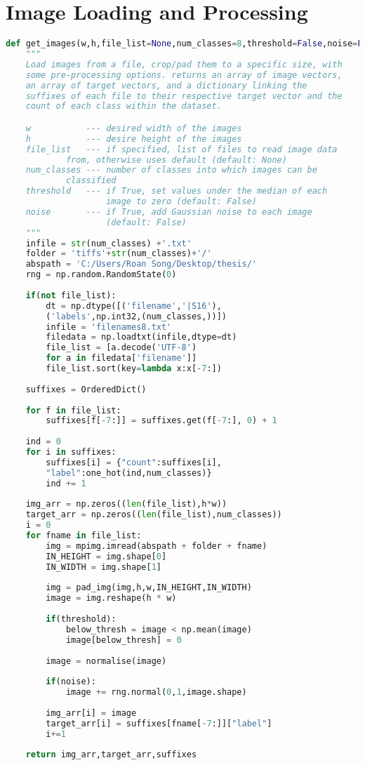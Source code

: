 \chapter{Image Loading and Processing}
\begin{lstlisting}[language=Python, caption=Loading and Processing Images, captionpos=b, label={list:get_images}]
def get_images(w,h,file_list=None,num_classes=8,threshold=False,noise=False):
	"""
	Load images from a file, crop/pad them to a specific size, with 
	some pre-processing options. returns an array of image vectors, 
	an array of target vectors, and a dictionary linking the 
	suffixes of each file to their respective target vector and the 
	count of each class within the dataset.

	w           --- desired width of the images
	h           --- desire height of the images
	file_list   --- if specified, list of files to read image data 
			from, otherwise uses default (default: None)
	num_classes --- number of classes into which images can be 
			classified
	threshold   --- if True, set values under the median of each 
					image to zero (default: False)
	noise       --- if True, add Gaussian noise to each image 
					(default: False)
	"""
	infile = str(num_classes) +'.txt'
	folder = 'tiffs'+str(num_classes)+'/'
	abspath = 'C:/Users/Roan Song/Desktop/thesis/'
	rng = np.random.RandomState(0)
	
	if(not file_list):
		dt = np.dtype([('filename','|S16'),
		('labels',np.int32,(num_classes,))])
		infile = 'filenames8.txt'
		filedata = np.loadtxt(infile,dtype=dt)
		file_list = [a.decode('UTF-8') 
		for a in filedata['filename']]
		file_list.sort(key=lambda x:x[-7:])
	
	suffixes = OrderedDict()
	
	for f in file_list:
		suffixes[f[-7:]] = suffixes.get(f[-7:], 0) + 1
	
	ind = 0
	for i in suffixes:    
		suffixes[i] = {"count":suffixes[i],
		"label":one_hot(ind,num_classes)}
		ind += 1    
	
	img_arr = np.zeros((len(file_list),h*w))
	target_arr = np.zeros((len(file_list),num_classes))
	i = 0
	for fname in file_list:	
		img = mpimg.imread(abspath + folder + fname)
		IN_HEIGHT = img.shape[0]
		IN_WIDTH = img.shape[1]
		
		img = pad_img(img,h,w,IN_HEIGHT,IN_WIDTH)
		image = img.reshape(h * w)
		
		if(threshold):
			below_thresh = image < np.mean(image)
			image[below_thresh] = 0
		
		image = normalise(image)
		
		if(noise):
			image += rng.normal(0,1,image.shape)
		
		img_arr[i] = image  
		target_arr[i] = suffixes[fname[-7:]]["label"]		
		i+=1 
			
	return img_arr,target_arr,suffixes
\end{lstlisting}
